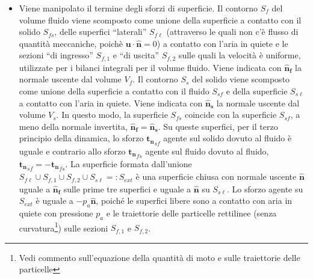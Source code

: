 \begin{itemize}
\item Viene manipolato il termine degli sforzi di superficie. Il contorno $S_f$ del volume fluido viene scomposto come unione della superficie a contatto con il solido $S_{fs}$, delle superfici ``laterali'' $S_{f\ell}$ (attraverso le quali non c'è flusso di quantità meccaniche, poichè $\bm{u}\cdot\bm{\hat{n}} = 0$) a contatto con l'aria in quiete e le sezioni ``di ingresso'' $S_{f,1}$ e ``di uscita'' $S_{f,2}$ sulle quali la velocità è uniforme, utilizzate per i bilanci integrali per il volume fluido. Viene indicata con $\bm{\hat{n}_f}$ la normale uscente dal volume $V_f$.
Il contorno $S_s$ del solido viene scomposto come unione della superficie a contatto con il fluido $S_{sf}$ e della superficie $S_{s\ell}$ a contatto con l'aria in quiete. Viene indicata con $\bm{\hat{n}_s}$ la normale uscente dal volume $V_s$.
In questo modo, la superficie $S_{fs}$ coincide con la superficie $S_{sf}$, a meno della normale invertita, $\bm{\hat{n}_f} = \bm{\hat{n}_s}$. Su queste superfici, per il terzo principio della dinamica, lo sforzo ${\bm{t_n}}_{sf}$ agente sul solido dovuto al fluido è uguale e contrario allo sforzo ${\bm{t_n}}_{fs}$ agente sul fluido dovuto al fluido, ${\bm{t_n}}_{sf}=-{\bm{t_n}}_{fs}$.
 La superficie formata dall'unione $S_{f\ell} \cup S_{f,1} \cup S_{f,2} \cup S_{s\ell} =:S_{ext}$ è una superficie chiusa con normale uscente $\bm{\hat{n}}$ uguale a $\bm{\hat{n}_f}$ sulle prime tre superfici e uguale a $\bm{\hat{n}}$ su $S_{s\ell}$. Lo sforzo agente su $S_{ext}$ è uguale a $-p_a\bm{\hat{n}}$, poiché le superfici libere sono a contatto con aria in quiete con pressione $p_a$ e le traiettorie delle particelle rettilinee (senza curvatura\footnote{Vedi commento sull'equazione della quantità di moto e sulle traiettorie delle particelle}) sulle sezioni $S_{f,1}$ e $S_{f,2}$.




\end{itemize}
